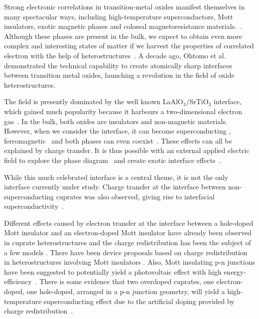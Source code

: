 \documentclass[twocolumn, preprintnumbers,prb,aps,amssymb,showpacs]{revtex4}
\begin{document}
Strong electronic correlations in transition-metal oxides manifest themselves in many spectacular ways, including high-temperature superconductors, Mott insulators, exotic magnetic phases and colossal magnetoresistance materials.~\cite{dagotto_complexity_2005}. Although these phases are present in the bulk, we expect to obtain even more complex and interesting states of matter if we harvest the properties of correlated electron with the help of heterostructures~\cite{dagotto_when_2007,ramirez_oxide_2007,heber_materials_2009,mannhart_oxide_2010,hwang_emergent_2012}. A decade ago, Ohtomo et al. \cite{ohtomo_artificial_2002} demonstrated the technical capability to create atomically sharp interfaces between transition metal oxides, launching a revolution in the field of oxide heterostructures.

The field is presently dominated by the well known LaAlO$_3$/SrTiO$_3$ interface, which gained much popularity because it harbours a two-dimensional electron gas~\cite{ohtomo_high-mobility_2004}. In the bulk, both oxides are insulators and non-magnetic materials. However, when we consider the interface, it can become superconducting \cite{reyren_superconducting_2007}, ferromagnetic~\cite{brinkman_magnetic_2007} and both phases can even coexist~\cite{li_coexistence_2011}. These effects can all be explained by charge transfer. It is thus possible with an external applied electric field to explore the phase diagram~\cite{ahn_electric_2003, caviglia_electric_2008,ueno_electric-field-induced_2008} and create exotic interface effects~\cite{caviglia_tunable_2010}.

While this much celebrated interface is a central theme, it is not the only interface currently under study. Charge transfer at the interface between non-superconducting cuprates was also observed, giving rise to interfacial superconductivity~\cite{gozar_high-temperature_2008,logvenov_high-temperature_2009}.

Different effects caused by electron transfer at the interface between a hole-doped Mott insulator and an electron-doped Mott insulator have already been observed in cuprate heterostructures \cite{gozar_high-temperature_2008,jin_anomalous_2011} and the charge redistribution has been the subject of a few models \cite{loktev_model_2008,loktev_superconducting_2011}. There have been  device proposals based on charge redistribution in heterostructures involving Mott insulators \cite{son_heterojunction_2011,millis_electron-hole_2010,hu_proposed_2007}. Also, Mott insulating p-n junctions have been suggested to potentially yield a photovoltaic effect with high energy-efficiency~\cite{manousakis_photovoltaic_2010}. There is some evidence that two overdoped cuprates, one electron-doped, one hole-doped, arranged in a p-n junction geometry, will yield a
high-temperature superconducting effect due to the artificial doping provided by charge redistribution~\cite{hardy_private_2012}. 
\end{document}
